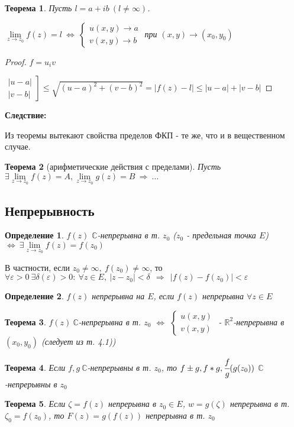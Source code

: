 \documentclass[draft]{report}
\newcommand{\then}{\ \Rightarrow\ }
\newcommand{\R}{\mathbb{R}}
\renewcommand{\C}{\mathbb{C}}
\newcommand{\mlim}[1]{\underset{#1}{\lim}}
\newcommand{\LRA}{\Leftrightarrow}
\newcommand{\epsdelta}{\forall \e>0\ \exists \delta(\e)>0\colon}
\newcommand{\e}{\varepsilon}
\newcommand{\sys}[1]{\left\{\begin{matrix}#1\end{matrix}\right.}
\newcommand{\opr}[1]{\begin{opred}#1\end{opred}}
\newtheorem*{theor}{Теорема}
\newtheorem*{opred}{Определение}
\theoremstyle{remark}
\begin{document}
\begin{theor}
Пусть $l=a+ib\ (l\neq\infty)$.

$\mlim{z\to z_0}f(z)=l\ \LRA\ \sys{u(x,y)\to a \\ v(x,y)\to b}$ при $(x,y)\to(x_0,y_0)$
\end{theor}

\begin{proof}
$f=u_iv$

$\left.\begin{matrix}|u-a|\\|v-b|\end{matrix}\right]\leq\sqrt{(u-a)^2+(v-b)^2}=|f(z)-l|\leq|u-a|+|v-b|$
\end{proof}

{\bfseries Следствие:}

Из теоремы вытекают свойства пределов ФКП - те же, что и в вещественном случае.

\begin{theor}[арифметические действия с пределами]
Пусть $\exists \mlim{z\to z_0}f(z)=A, \mlim{z\to z_0}g(z)=B \then \ldots$
\end{theor}

\subsection{Непрерывность}

\opr{$f(z)$ $\C$-непрерывна в т. $z_0$ ($z_0$ - предельная точка $E$) $\LRA\ \exists \mlim{z\to z_0}f(z)=f(z_0)$}

В частности, если $z_0\neq\infty,\ f(z_0)\neq\infty$, то $\epsdelta\ \forall z\in E,\ |z-z_0|<\delta\ \then\ |f(z)-f(z_0)|<\e$

\opr{$f(z)$ непрерывна на $E$, если $f(z)$ непрерывна $\forall z\in E$}

\begin{theor}
$f(z)\ \C$-непрерывна в т. $z_0$ $\LRA$ $\sys{u(x,y)\\v(x,y)}$ - $\R^2$-непрерывна в $(x_0,y_0)$ (следует из т. 4.1))
\end{theor}

\begin{theor}
Если $f,g\ \C$-непрерывны в т. $z_0$, то $f\pm g, f*g, \cfrac fg (g(z_0))$ $\C$-непрерывны в $z_0$
\end{theor}

\begin{theor}
Если $\zeta=f(z)$ непрерывна в $z_0\in E$, $w=g(\zeta)$ непрерывна в т. $\zeta_0=f(z_0)$, то $F(z)=g(f(z))$ непрерывна в т. $z_0$
\end{theor}
\end{document}
